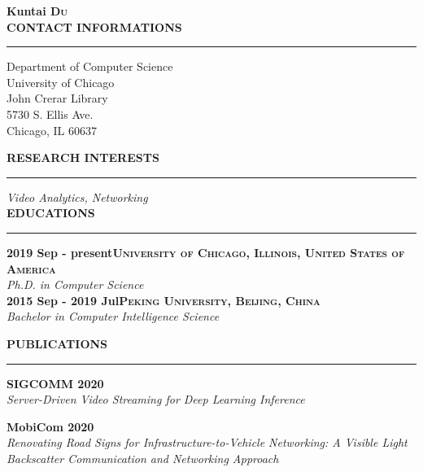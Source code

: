 \documentclass[a4paper,10pt,final]{memoir}
\newcommand{\myThemeColor}{Maroon}
\newcommand{\SmallSep}{\vspace{0.9em}}
\newcommand{\smallsep}{\vspace{0.45em}}
\newcommand{\CVSection}[1]
	{\large\textbf{\textsf{#1}}\par
	\smallsep\normalsize\normalfont}
\newcommand{\CVItem}[1]
	{\textbf{\color{\myThemeColor} #1}}
\begin{document}




\Huge\bfseries {\color{\myThemeColor} Kuntai \textsc{Du}}
\normalsize\normalfont
{}\\

\CVSection{CONTACT INFORMATIONS}
\hrule
\SmallSep
Department of Computer Science \\
University of Chicago\\
John Crerar Library\\
5730 S. Ellis Ave.\\
Chicago, IL  60637

\SmallSep

\CVSection{RESEARCH INTERESTS}
\hrule
\SmallSep
\textit{Video Analytics, Networking}
\\

\CVSection{EDUCATIONS}
\hrule
\SmallSep
\CVItem{2019 Sep - present\hfill\textsc{University of Chicago, Illinois, United States of America}}\\
\textit{Ph.D. in Computer Science}\\
\CVItem{2015 Sep - 2019 Jul\hfill\textsc{Peking University, Beijing, China}}\\
\textit{Bachelor in Computer Intelligence Science}

\SmallSep

\CVSection{PUBLICATIONS}
\hrule
\SmallSep

\CVItem{SIGCOMM 2020}\\
\textit{Server-Driven Video Streaming for Deep Learning Inference} \\

\SmallSep

\CVItem{MobiCom 2020}\\
\textit{Renovating Road Signs for Infrastructure-to-Vehicle Networking: A Visible Light Backscatter Communication and Networking Approach} \\
\end{document}
